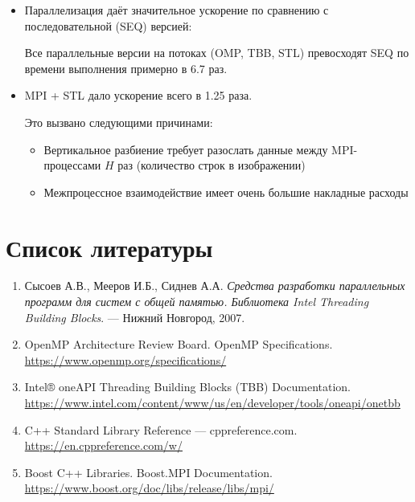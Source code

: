 \documentclass[12pt]{article}
\begin{document}
\begin{itemize}
	\item Параллелизация даёт значительное ускорение по сравнению с последовательной (SEQ) версией:
	
		Все параллельные версии на потоках (OMP, TBB, STL) превосходят SEQ по времени выполнения примерно в 6.7 раз.
		
	\item MPI + STL дало ускорение всего в 1.25 раза.
	
		Это вызвано следующими причинами:
		
		\begin{itemize}
			\item Вертикальное разбиение требует разослать данные между MPI-процессами $H$ раз (количество строк в изображении)
			\item Межпроцессное взаимодействие имеет очень большие накладные расходы
		\end{itemize}
\end{itemize}

\newpage

\section{Список литературы}
\begin{enumerate}
	\item Сысоев А.В., Мееров И.Б., Сиднев А.А. \textit{Средства разработки параллельных программ для систем с общей памятью. Библиотека Intel Threading Building Blocks}. — Нижний Новгород, 2007.
	
	\item OpenMP Architecture Review Board. OpenMP Specifications. \\ 
	\url{https://www.openmp.org/specifications/}
	
	\item Intel® oneAPI Threading Building Blocks (TBB) Documentation. \\ 
	\url{https://www.intel.com/content/www/us/en/developer/tools/oneapi/onetbb}
	
	\item C++ Standard Library Reference — cppreference.com. \\ 
	\url{https://en.cppreference.com/w/}
	
	\item Boost C++ Libraries. Boost.MPI Documentation. \\ 
	\url{https://www.boost.org/doc/libs/release/libs/mpi/}
\end{enumerate}
\end{document}

